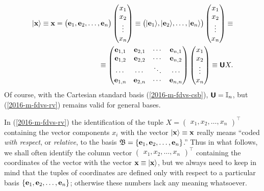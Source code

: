 \begin{equation}
\begin{split}
\vert {\bf x} \rangle \equiv {\bf x} =
\begin{pmatrix}{\bf e}_1,{\bf e}_2, \ldots , {\bf e}_n\end{pmatrix}
\begin{pmatrix} x_1\\x_2\\ \vdots \\ x_n \end{pmatrix}
\equiv
\begin{pmatrix} \vert {\bf e}_1\rangle ,\vert {\bf e}_2 \rangle ,  \ldots , \vert {\bf e}_n\rangle \end{pmatrix}
\begin{pmatrix} x_1\\x_2\\ \vdots \\ x_n \end{pmatrix} \equiv
\\
\equiv
\begin{pmatrix}
{\bf e}_{1,1} &   {\bf e}_{2,1}  &  \cdots &  {\bf e}_{n,1}\\
{\bf e}_{1,2} &   {\bf e}_{2,2}  &  \cdots &  {\bf e}_{n,2}\\
\cdots  & \cdots  &  \ddots &  \cdots \\
{\bf e}_{1,n} &   {\bf e}_{2,n}  &  \cdots &  {\bf e}_{n,n}\\
\end{pmatrix}
\begin{pmatrix} x_1\\x_2\\ \vdots \\ x_n \end{pmatrix}
\equiv
\textsf{\textbf{U}} X
 .
\label{2016-m-fdvs-rv}
\end{split}
\end{equation}
Of course, with the Cartesian standard basis (\ref{2016-m-fdvs-csb}), $\textsf{\textbf{U}} = {\Bbb I}_n$, but
(\ref{2016-m-fdvs-rv}) remains valid for general bases.


In (\ref{2016-m-fdvs-rv}) the identification of the tuple
$ X = \begin{pmatrix}
x_1, x_2, \ldots , x_n
\end{pmatrix}^\intercal
$
containing the vector components $x_i$
with the vector $\vert {\bf x} \rangle \equiv {\bf x}$
really means
``coded {\em with respect}, or {\em relative},  to the basis ${\frak B}=\{{\bf e}_1,{\bf e}_2, \ldots , {\bf e}_n\}$.''
Thus in what follows, we shall often identify the column vector
$
\begin{pmatrix}
x_1, x_2, \ldots , x_n
\end{pmatrix}^\intercal
$
containing the coordinates of the vector
with the vector ${\bf x}\equiv \vert {\bf x} \rangle$, but we always need to keep in mind that
the tuples of coordinates are defined only with respect to a particular basis
$\{ {\bf e}_1,{\bf e}_2, \ldots , {\bf e}_n \}$; otherwise these numbers lack any meaning whatsoever.

